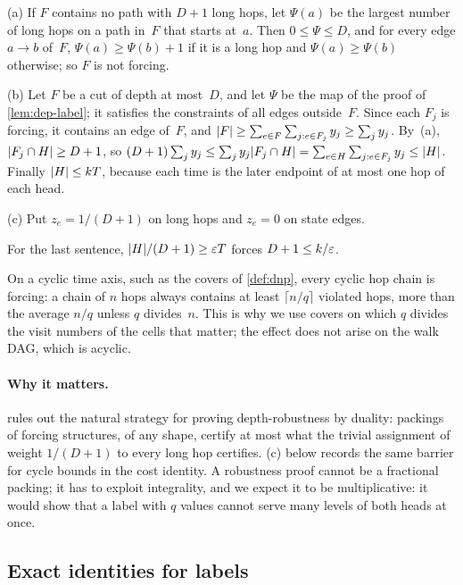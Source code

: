 \begin{informalproof}
(a) If $F$ contains no path with $D+1$ long hops, let $\Psi(a)$ be the largest number of long hops on a path in~$F$
that starts at~$a$. Then $0\le\Psi\le D$, and for every edge $a\to b$ of~$F$, $\Psi(a)\ge\Psi(b)+1$ if it is a long
hop and $\Psi(a)\ge\Psi(b)$ otherwise; so $F$ is not forcing.

(b) Let $F$ be a cut of depth at most~$D$, and let $\Psi$ be the map of the proof of \cref{lem:dep-label}; it satisfies
the constraints of all edges outside~$F$. Since each $F_j$ is forcing, it contains an edge of~$F$, and
$\lvert F \rvert\ge\sum_{e\in F}\sum_{j:e\in F_j}y_j\ge\sum_jy_j$. By~(a), $\lvert F_j\cap H \rvert\ge D+1$, so
$(D+1)\sum_jy_j\le\sum_jy_j\lvert F_j\cap H \rvert=\sum_{e\in H}\sum_{j:e\in F_j}y_j\le\lvert H \rvert$. Finally $\lvert H \rvert\le kT$,
because each time is the later endpoint of at most one hop of each head.

(c) Put $z_e=1/(D+1)$ on long hops and $z_e=0$ on state edges.

For the last sentence, $\lvert H \rvert/(D+1)\ge\varepsilon T$ forces $D+1\le k/\varepsilon$.
\end{informalproof}

On a cyclic time axis, such as the covers of \cref{def:dnp}, every cyclic hop chain is forcing: a chain of $n$ hops
always contains at least $\lceil n/q\rceil$ violated hops, more than the average $n/q$ unless $q$ divides~$n$. This is
why we use covers on which $q$ divides the visit numbers of the cells that matter; the effect does not arise on the
walk DAG, which is acyclic.

\paragraph{Why it matters.}  rules out the natural strategy for proving depth-robustness by duality:
packings of forcing structures, of any shape, certify at most what the trivial assignment of weight $1/(D+1)$ to
every long hop certifies. (c) below records the same barrier for cycle bounds in the cost
identity. A robustness proof cannot be a fractional packing; it has to exploit integrality, and we expect it to be
multiplicative: it would show that a label with $q$ values cannot serve many levels of both heads at once.

\subsection{Exact identities for labels}\label{sec:dep-identities}


